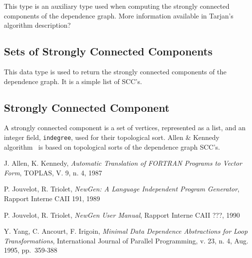 \documentclass[a4paper]{article}
\begin{document}
{}

This type is an auxiliary type used when computing the strongly
connected components of the dependence graph. More information
available in Tarjan's algorithm description?

\begin{comment}
Ce domaine est utilise' par l'algorithme de calcul des composantes
fortement connexes d'un graphe.
\end{comment}

\subsection{Sets of Strongly Connected Components}

{}

This data type is used to return the strongly connected components of
the dependence graph. It is a simple list of SCC's.

\begin{comment}
Ce domaine permet de contenir le re'sultat de l'algorithme de calcul
des composantes fortement connexes d'un graphe. Il s'agit d'une liste de
{\tt scc}, c'est a` dire de composantes fortement connexes.
\end{comment}

\subsection{Strongly Connected Component}

{}

A strongly connected component is a set of vertices, represented as a
list, and an integer field, \verb/indegree/, used for their topological
sort. Allen \& Kennedy algorithm~\cite{AK87} is based on topological sorts of the
dependence graph SCC's.

\begin{comment}
Ce domaine permet de repre'senter une composante fortement connexe d'un
graphe. Une {\tt scc} se compose d'un ensemble de noeuds, et d'un
sous-domaine {\tt indegree} utilise' par l'algorithme de tri topologique.
\end{comment}

\begin{thebibliography}{9}


 J. Allen, K. Kennedy,
{\em Automatic Translation of {FORTRAN} Programs to Vector Form},
TOPLAS, V. 9, n. 4, 1987

 P. Jouvelot, R. Triolet,
{\em NewGen: A Language Independent Program Generator},
Rapport Interne CAII 191, 1989

 P. Jouvelot, R. Triolet,
{\em NewGen User Manual},
Rapport Interne CAII ???, 1990

 Y. Yang, C. Ancourt, F. Irigoin,
{\em Minimal Data Dependence Abstractions for Loop Transformations}, 
International Journal of Parallel Programming,
v. 23, n. 4, Aug. 1995, pp.~359-388

\end{thebibliography}
\end{document}
